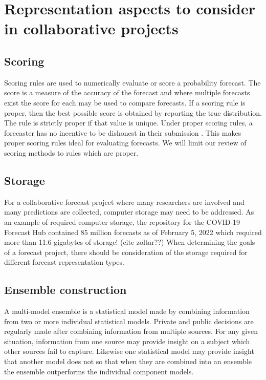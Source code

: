 \documentclass[11pt,notitlepage]{isuthesis}
\begin{document}
\section{Representation aspects to consider in collaborative projects}
\subsection{Scoring}
Scoring rules are used to numerically evaluate or score a probability forecast. 
The
score is a measure of the accuracy of the forecast and where multiple forecasts
exist the score for each may be used to compare forecasts. If a scoring rule 
is proper, then the best possible score is obtained by reporting the true 
distribution. The rule is strictly proper if that value is unique. 
Under proper
scoring rules, a forecaster has no incentive to be dishonest in their 
submission \cite{gneiting2007strictly}. This makes proper scoring rules ideal
for evaluating forecasts. We will limit our review of scoring methods to rules
which are proper.

\subsection{Storage}
For a collaborative forecast project where many researchers are involved and 
many predictions are collected, computer storage may need to be addressed. 
As an example of required computer storage, the 
repository for the
COVID-19 Forecast Hub contained 85 million forecasts as of 
February 5, 2022 which required more than 11.6 gigabytes of storage!
(cite zoltar??)
When determining the goals of a forecast project, there should be consideration 
of the storage required for different forecast representation types.

\subsection{Ensemble construction}
A multi-model ensemble is a statistical model made by combining information from
two or more individual statistical models. Private and public decisions are 
regularly made after combining information from multiple sources. For any given
situation, information from one source may provide insight on a subject which 
other
sources fail to capture. Likewise one statistical model may provide insight
that another model does not so that when they are combined into an ensemble the 
ensemble outperforms the individual component models.
\end{document}
